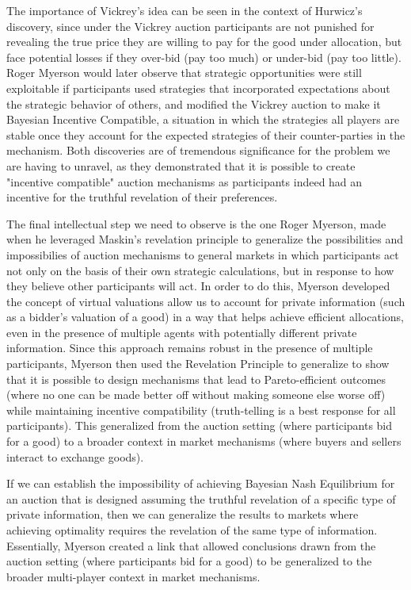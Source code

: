 \documentclass[sigconf,anonymous]{aamas}
\begin{document}
The importance of Vickrey's idea can be seen in the context of Hurwicz's discovery, since under the Vickrey auction participants are not punished for revealing the true price they are willing to pay for the good under allocation, but face potential losses if they over-bid (pay too much) or under-bid (pay too little). Roger Myerson would later observe that strategic opportunities were still exploitable if participants used strategies that incorporated expectations about the strategic behavior of others, and modified the Vickrey auction to make it Bayesian Incentive Compatible, a situation in which the strategies all players are stable once they account for the expected strategies of their counter-parties in the mechanism. Both discoveries are of tremendous significance for the problem we are having to unravel, as they demonstrated that it is possible to create "incentive compatible" auction mechanisms as participants indeed had an incentive for the truthful revelation of their preferences.

The final intellectual step we need to observe is the one Roger Myerson, made when he leveraged Maskin's revelation principle to generalize the possibilities and impossibilies of auction mechanisms to general markets in which participants act not only on the basis of their own strategic calculations, but in response to how they believe other participants will act. In order to do this, Myerson developed the concept of virtual valuations allow us to account for private information (such as a bidder's valuation of a good) in a way that helps achieve efficient allocations, even in the presence of multiple agents with potentially different private information. Since this approach remains robust in the presence of multiple participants, Myerson then used the Revelation Principle to generalize to show that it is possible to design mechanisms that lead to Pareto-efficient outcomes (where no one can be made better off without making someone else worse off) while maintaining incentive compatibility (truth-telling is a best response for all participants). This generalized from the auction setting (where participants bid for a good) to a broader context in market mechanisms (where buyers and sellers interact to exchange goods).

If we can establish the impossibility of achieving Bayesian Nash Equilibrium for an auction that is designed assuming the truthful revelation of a specific type of private information, then we can generalize the results to markets where achieving optimality requires the revelation of the same type of information. Essentially, Myerson created a link that allowed conclusions drawn from the auction setting (where participants bid for a good) to be generalized to the broader multi-player context in market mechanisms.
\end{document}
